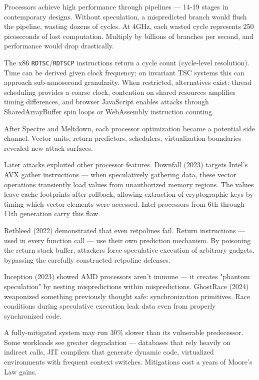 Processors achieve high performance through pipelines — 14-19 stages in contemporary designs. Without speculation, a mispredicted branch would flush the pipeline, wasting dozens of cycles. At 4GHz, each wasted cycle represents 250 picoseconds of lost computation. Multiply by billions of branches per second, and performance would drop drastically.

The x86 \texttt{RDTSC}/\texttt{RDTSCP} instructions return a cycle count (cycle-level resolution). Time can be derived given clock frequency; on invariant TSC systems this can approach sub-nanosecond granularity. When restricted, alternatives exist: thread scheduling provides a coarse clock, contention on shared resources amplifies timing differences, and browser JavaScript enables attacks through SharedArrayBuffer spin loops or WebAssembly instruction counting.

After Spectre and Meltdown, each processor optimization became a potential side channel. Vector units, return predictors, schedulers, virtualization boundaries revealed new attack surfaces.

Later attacks exploited other processor features. Downfall (2023) targets Intel's AVX gather instructions — when speculatively gathering data, these vector operations transiently load values from unauthorized memory regions. The values leave cache footprints after rollback, allowing extraction of cryptographic keys by timing which vector elements were accessed. Intel processors from 6th through 11th generation carry this flaw.

Retbleed (2022) demonstrated that even retpolines fail. Return instructions — used in every function call — use their own prediction mechanism. By poisoning the return stack buffer, attackers force speculative execution of arbitrary gadgets, bypassing the carefully constructed retpoline defenses.

Inception (2023) showed AMD processors aren't immune — it creates "phantom speculation" by nesting mispredictions within mispredictions. GhostRace (2024) weaponized something previously thought safe: synchronization primitives. Race conditions during speculative execution leak data even from properly synchronized code.

A fully-mitigated system may run 30\% slower than its vulnerable predecessor. Some workloads see greater degradation — databases that rely heavily on indirect calls, JIT compilers that generate dynamic code, virtualized environments with frequent context switches. Mitigations cost a years of Moore's Law gains.



